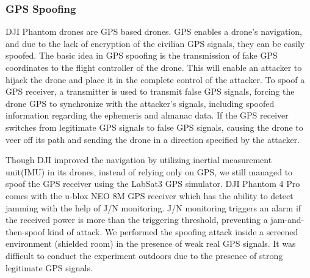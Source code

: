 \documentclass[conference]{IEEEtran}
\begin{document}
\subsubsection{GPS Spoofing}
DJI Phantom drones are GPS based drones. 
GPS enables a drone’s navigation, and due to the lack of encryption of the civilian GPS signals, they can be easily spoofed. The basic idea in GPS spoofing is the transmission of fake GPS coordinates to the flight controller of the drone.
This will enable an attacker to hijack the drone and place it in the complete control of the attacker.
To spoof a GPS receiver, a transmitter is used to transmit false GPS signals, forcing the drone GPS to synchronize with the attacker’s signals, including spoofed information regarding the ephemeris and almanac data. 
If the GPS receiver switches from legitimate GPS signals to false GPS signals, causing the drone to veer off its path and sending the drone in a direction specified by the attacker. 


Though DJI improved the navigation by utilizing inertial measurement unit(IMU) in its drones, instead of relying only on GPS, we still managed to spoof the GPS receiver using the LabSat3 GPS simulator\cite{labsat}. 
DJI Phantom 4 Pro comes with the u-blox NEO 8M GPS receiver which has the ability to detect jamming with the help of J/N monitoring. 
J/N monitoring triggers an alarm if the received power is more than the triggering threshold, preventing a jam-and-then-spoof kind of attack. 
We performed the spoofing attack inside a screened environment (shielded room) in the presence of weak real GPS signals.
It was difficult to conduct the experiment outdoors due to the presence of strong legitimate GPS signals.
\end{document}
